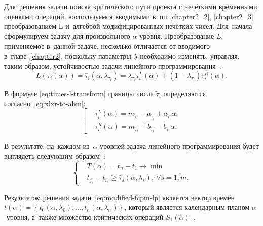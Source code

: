 Для~решения задачи поиска критического пути проекта с нечёткими временными оценками операций, воспользуемся вводимыми в~пп.\,\ref{chapter2_2}, \ref{chapter2_3} преобразованием L и~алгеброй модифицированных нечётких чисел. Для~начала сформулируем задачу для произвольного $\alpha$-уровня. Преобразование $L$, применяемое в~данной задаче, несколько отличается от вводимого в~главе~\ref{chapter2}, поскольку параметры $\lambda$ необходимо изменять, управляя, таким образом, устойчивостью задачи линейного программирования~\cite{Vorontsov_VSTU}:
\begin{equation}
\label{eq:times-l-transform}
  L(\tau_i(\alpha ))=\bar{\tau}_i\left(\alpha, \lambda_{\tau_i}\right)=\lambda_{\tau_i}\tau_{i}^{L}\left(\alpha \right)+(1-\lambda_{\tau_i})\tau_{i}^{R}\left(\alpha \right).
\end{equation}

В формуле \eqref{eq:times-l-transform} границы числа $\tilde \tau_i$ определяются согласно~\eqref{eq:xlxr-to-abm}:
\begin{equation*}
  \left[ \begin{aligned}
    & \tau_{i}^{L}\left(\alpha \right)=m_{\tilde \tau_i}-a_{\tilde \tau_i}+a_{\tilde \tau_i}\alpha; \\ 
    & \tau_{i}^{R}\left(\alpha \right)={{m}_{{{{\tilde{\tau }}}_{i}}}}+{{b}_{{{{\tilde{\tau }}}_{i}}}}-{{b}_{{{{\tilde{\tau }}}_{i}}}}\alpha.
  \end{aligned} \right.
\end{equation*}

В результате, на~каждом из~$\alpha$-уровней задача линейного программирования будет выглядеть следующим образом~\cite{Alushta-2, Vorontsov_VSTU}:
\begin{equation}
\label{eq:modified-fcpm-lp}
  \left\{ \begin{aligned}
    & T(\alpha )=t_n-t_1\to \min  \\ 
    & t_{j_s}-t_{i_s}\geqslant \bar{\tau}_s\left(\alpha,\lambda_s \right),\ \forall s=\overline{1,m}.
  \end{aligned} \right.
\end{equation}

Результатом решения задачи~\eqref{eq:modified-fcpm-lp} является вектор времён $t\left( \alpha \right)=\left\{ t_0\left(\alpha, \lambda_0\right),\ldots,t_n\left(\alpha, \lambda_n\right) \right\}$, который является календарным планом $\alpha$-уровня, а~также множество критических операций $S_1\left( \alpha \right)$~\cite{VSU-2, Alushta-2}.

